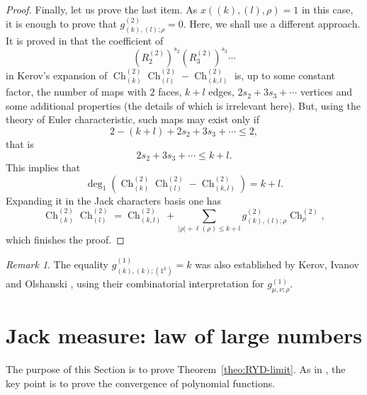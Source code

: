 \documentclass[11pt]{amsart}
\theoremstyle{plain}
\theoremstyle{remark}
\newtheorem*{remark}{Remark}
\DeclareMathOperator{\Ch}{Ch}
\begin{document}
\begin{proof}
Finally, let us prove the last item.
As $x( (k),(l),\rho)=1$ in this case,
it is enough to prove that $g^{(2)}_{(k),(l);\rho} = 0$.
Here, we shall use a different approach.
It is proved in \cite[Theorem 5.3]{NousZonal} that the coefficient of
\[
 \left(R_2^{(2)}\right)^{s_2}
\left(R_3^{(2)}\right)^{s_3} \cdots
\]
in Kerov's expansion of $\Ch^{(2)}_{(k)}\Ch^{(2)}_{(l)} - \Ch^{(2)}_{(k,l)}$ is,
up to some constant factor,
the number of maps with $2$ faces, $k+l$ edges, $2s_2+ 3s_3 + \cdots$ vertices
and some additional properties
(the details of which is irrelevant here).
But, using the theory of Euler characteristic, such maps may exist only if
\[2-(k+l)+2s_2+ 3s_3 + \cdots \le 2,\]
that is
\[2s_2+ 3s_3 + \cdots \le k+l.\]
This implies that 
\[\deg_1\left(\Ch^{(2)}_{(k)}\Ch^{(2)}_{(l)} - \Ch^{(2)}_{(k,l)}\right) = k+l. \]                          
Expanding it in the Jack characters basis one has                               
\[ \Ch^{(2)}_{(k)}\Ch^{(2)}_{(l)} = \Ch^{(2)}_{(k,l)} + \sum_{|\rho|+\ell(\rho) \leq k+l} g^{(2)}_{(k),(l);\rho} \Ch^{(2)}_\rho,\]
which finishes the proof.
\end{proof}

\begin{remark}
The equality $g^{(1)}_{(k),(k);(1^k)} = k$ was also established
by Kerov, Ivanov and Olshanski \cite[Proposition 4.12.]{IvanovOlshanski2002},
using their combinatorial interpretation for $g^{(1)}_{\mu,\nu;\rho}$.
\end{remark}


\section{Jack measure: law of large numbers}
\label{sect:FirstOrder}

The purpose of this Section is to prove Theorem~\ref{theo:RYD-limit}.
As in \cite{IvanovOlshanski2002},
the key point is to prove the convergence of polynomial functions.
\end{document}
